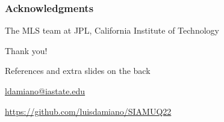 \documentclass[aspectratio=169,t,xcolor=table]{beamer}
\begin{document}
\begin{frame}
  \frametitle{Acknowledgments}
  \centering

  The MLS team at JPL, California Institute of Technology

  \vfill

  {\huge Thank you!}

  \vfill

  {\tiny References and extra slides on the back}

  \href{ldamiano@iastate.edu}{
    ldamiano@iastate.edu}

  \href{https://github.com/luisdamiano/SIAMUQ22}{
https://github.com/luisdamiano/SIAMUQ22}

\end{frame}



\end{document}
